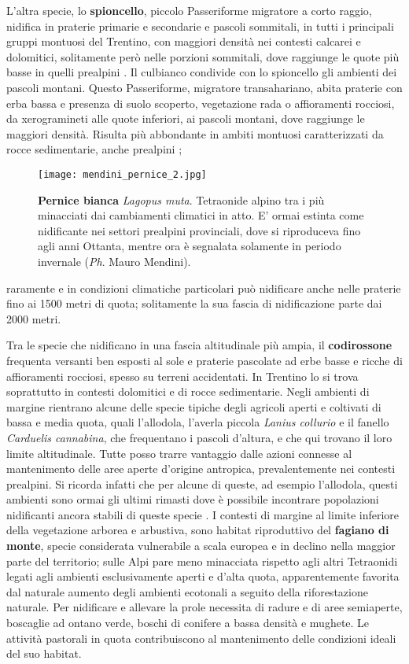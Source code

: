 \documentclass[10pt,twoside,openany,x11names,svgnames,italian,a5paper,dvipsnames,table]{memoir}
\newcommand{\ph}{\emph{Ph}. }
\begin{document}
L’altra specie, lo \textbf{spioncello}, piccolo Passeriforme migratore a corto raggio, nidifica in praterie primarie e secondarie e pascoli sommitali, in tutti i principali gruppi montuosi del Trentino, con maggiori densità nei contesti calcarei e dolomitici, solitamente però nelle porzioni sommitali, dove raggiunge le quote più basse in quelli prealpini \cite{Pedrini05}. Il culbianco condivide con lo spioncello gli ambienti dei pascoli montani. Questo Passeriforme, migratore transahariano, abita praterie con erba bassa e presenza di suolo scoperto, vegetazione rada o affioramenti rocciosi, da xerogramineti alle quote inferiori, ai pascoli montani, dove raggiunge le maggiori densità. Risulta più abbondante in ambiti montuosi caratterizzati da rocce sedimentarie, anche prealpini \cite{Pedrini05}; \begin{wrapfigure}[19]{l}{.6\columnwidth}
\centering
  \texttt{[image: mendini\_pernice\_2.jpg]}
  \caption*{\textbf{Pernice bianca} \emph{Lagopus muta}. Tetraonide alpino tra i più minacciati dai cambiamenti climatici in atto. E' ormai estinta come nidificante nei settori prealpini provinciali, dove si riproduceva fino agli anni Ottanta, mentre ora è segnalata solamente
in periodo invernale (\ph Mauro Mendini).}
\end{wrapfigure}raramente e in condizioni climatiche particolari può nidificare anche nelle praterie fino ai 1500 metri di quota; solitamente la sua fascia di nidificazione parte dai 2000 metri.

Tra le specie che nidificano in una fascia altitudinale più ampia, il \textbf{codirossone} frequenta versanti ben esposti al sole e praterie pascolate ad erbe basse e ricche  di affioramenti rocciosi, spesso su terreni accidentati. In Trentino lo si trova soprattutto in contesti dolomitici e di rocce sedimentarie. Negli ambienti di margine rientrano alcune delle specie tipiche degli agricoli aperti e coltivati di bassa e media quota, quali l’allodola, l’averla piccola \emph{Lanius collurio} e il fanello \emph{Carduelis cannabina}, che frequentano i pascoli d’altura, e che qui trovano il loro limite altitudinale. Tutte posso trarre vantaggio dalle azioni connesse al mantenimento delle aree aperte d’origine antropica, prevalentemente nei contesti prealpini. Si ricorda infatti che per alcune di queste, ad esempio l’allodola, questi ambienti sono ormai gli ultimi rimasti dove è possibile incontrare popolazioni nidificanti ancora stabili di queste specie \cite{Pedrini05}. 
I contesti di margine al limite inferiore della vegetazione arborea e arbustiva, sono habitat riproduttivo del \textbf{fagiano di monte}, specie considerata vulnerabile a scala europea e in declino nella maggior parte del territorio; sulle Alpi pare meno minacciata rispetto agli altri Tetraonidi legati agli ambienti esclusivamente aperti e d’alta quota, apparentemente favorita dal naturale aumento degli ambienti ecotonali a seguito della riforestazione naturale. Per nidificare e allevare la prole necessita di radure e di aree semiaperte, boscaglie ad ontano verde, boschi di conifere a bassa densità e mughete. Le attività pastorali in quota contribuiscono al mantenimento delle condizioni ideali del suo habitat.
\end{document}
